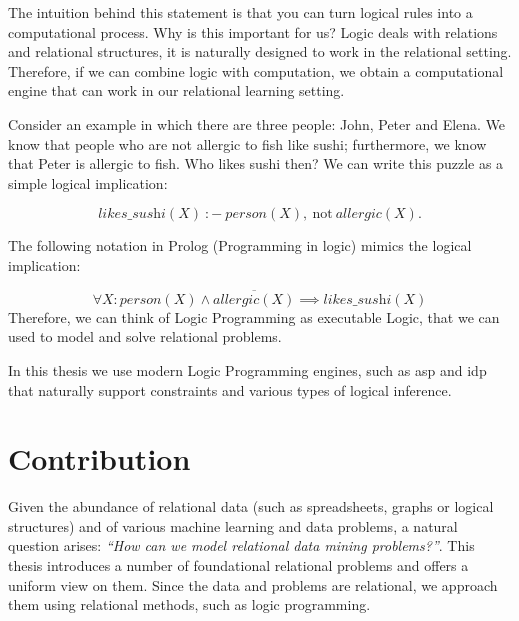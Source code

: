 The intuition behind this statement is that
you can turn logical rules into a computational process. 
Why is this important for us? Logic deals with
relations and relational structures, it is naturally designed to
work in the relational setting. Therefore, if we can combine logic
with computation, we obtain a computational engine that can work in
our relational learning setting.

Consider an example in which there are three people: John, Peter and Elena. 
We know that people who are not allergic to fish like sushi; 
furthermore, we know that Peter is allergic to fish. 
Who likes sushi then? We can write this puzzle as a
simple logical implication:

\begin{equation*}
  \textit{likes\_sushi}(X)~{:}{-}~\textit{person}(X),~\text{not}~
  \textit{allergic}(X). 
\end{equation*}

The following notation in Prolog (Programming in logic)
\cite{prolog_original} mimics the logical implication:

\begin{equation*}
  \forall X: \textit{person}(X) \wedge \overline{\textit{allergic}(X)}
  \implies \textit{likes\_sushi}(X)
\end{equation*}
Therefore, we can think of Logic Programming as executable Logic, that
we can used to model and solve relational problems.

In this thesis we use modern Logic Programming engines, such
as \acrlong{asp} \parencite{ASPbook,whatisasp} and \acrlong{idp}
\parencite{idp} %
that naturally support constraints and various types of logical
inference.


\section{Contribution}
Given the abundance of relational data (such as spreadsheets, graphs
or logical structures) and of various machine learning and data
problems, a natural question arises: \textit{``How can we model
relational data mining problems?''}. This thesis introduces a number
of foundational relational problems and offers a uniform view on them.
Since the data and problems are relational, we approach them using
relational methods, such as logic programming. 

